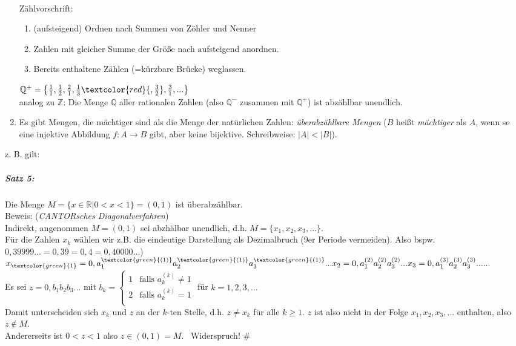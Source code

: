 \begin{enumerate}
\\
Zählvorschrift:
\begin{enumerate}
\item (aufsteigend) Ordnen nach Summen von Zöhler und Nenner
\item Zahlen mit gleicher Summe der Größe nach aufsteigend anordnen.
\item Bereits enthaltene Zählen (=kürzbare Brücke) weglassen.
\end{enumerate}
$\mathbb{Q}^+=\left\lbrace\frac{1}{1},\frac{1}{2}, \frac{2}{1}, \frac{1}{3}\textcolor{red}{, \frac{3}{2}}, \frac{3}{1}, ... \right\rbrace$\\
analog zu $\mathbb{Z}$: Die Menge $\mathbb{Q}$ aller rationalen Zahlen (also $\mathbb{Q}^-$ zusammen mit $\mathbb{Q}^+$) ist abzählbar unendlich.
\item Es gibt Mengen, die mächtiger sind als die Menge der natürlichen Zahlen: \emph{überabzählbare Mengen} ($B$ heißt \emph{mächtiger} als $A$, wenn se eine injektive Abbildung $f: A \rightarrow B$ gibt, aber keine bijektive. Schreibweise: $|A|<|B|$).
\end{enumerate}
z. B. gilt:
\subparagraph{Satz 5:} Die Menge $M=\{x \in \mathbb{R} | 0<x<1\}=(0,1)$ ist überabzählbar.\\
Beweis: (\emph{CANTORsches Diagonalverfahren})\\
Indirekt, angenommen $M=(0,1)$ sei abzhälbar unendlich, d.h. $M=\{x_1, x_2, x_3, ...\}$.\\
Für die Zahlen $x_k$ wählen wir z.B. die eindeutige Darstellung als Dezimalbruch (9er Periode vermeiden). Also bspw. $0,39999...=0,3\overline{9}=0,4=0,40000...$)\\
$x_{\textcolor{green}{1}}=0,a_1^{\textcolor{green}{(1)}}a_2^{\textcolor{green}{(1)}}a_3^{\textcolor{green}{(1)}}...\\
x_2=0,a_1^{(2)}a_2^{(2)}a_3^{(2)}...\\
x_3=0,a_1^{(3)}a_2^{(3)}a_3^{(3)}...\\
...$\\
Es sei $z=0,b_1 b_2 b_3 ...$ mit 
$b_k=\begin{cases} 
1 & \text{falls } a_k^{(k)}\not = 1\\
2 & \text{falls } a_k^{(k)} = 1\\
\end{cases}$
für $k=1,2,3,...$\\
Damit unterscheiden sich $x_k$ und $z$ an der $k$-ten Stelle, d.h. $z \not = x_k$ für alle $k\geq 1$. $z$ ist also nicht in der Folge $x_1, x_2, x_3, ...$ enthalten, also \emph{$z\not \in M$}.\\
Andererseits ist $0<z<1$ also \emph{$z\in (0,1) = M$}. \lightning\, Widerspruch! \#

